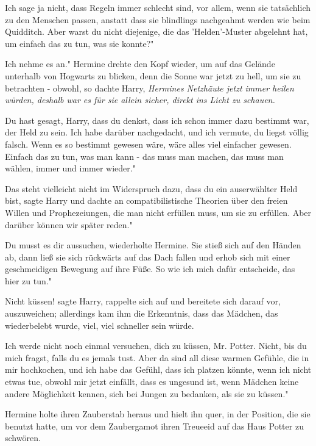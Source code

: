 \glqq{}Ich sage ja nicht, dass Regeln immer schlecht sind, vor allem, wenn sie
tatsächlich zu den Menschen passen, anstatt dass sie blindlings nachgeahmt
werden wie beim Quidditch. Aber warst du nicht diejenige, die das
'Helden'-Muster abgelehnt hat, um einfach das zu tun, was sie konnte?"

\glqq{}Ich nehme es an." Hermine drehte den Kopf wieder, um auf das Gelände
unterhalb von Hogwarts zu blicken, denn die Sonne war jetzt zu hell, um sie zu
betrachten - obwohl, so dachte Harry, \emph{Hermines Netzhäute jetzt immer
heilen würden, deshalb war es für sie allein sicher, direkt ins Licht zu
schauen.}

\glqq{}Du hast gesagt, Harry, dass du denkst, dass ich schon immer dazu bestimmt
war, der Held zu sein. Ich habe darüber nachgedacht, und ich vermute, du liegst
völlig falsch. Wenn es so bestimmt gewesen wäre, wäre alles viel einfacher
gewesen. Einfach das zu tun, was man kann - das muss man machen, das muss man
wählen, immer und immer wieder."

\glqq{}Das steht vielleicht nicht im Widerspruch dazu, dass du ein auserwählter
Held bist\grqq{}, sagte Harry und dachte an compatibilistische Theorien über den
freien Willen und Prophezeiungen, die man nicht erfüllen muss, um sie zu
erfüllen. \glqq{}Aber darüber können wir später reden."

\glqq{}Du musst es dir aussuchen\grqq{}, wiederholte Hermine. Sie stieß sich auf
den Händen ab, dann ließ sie sich rückwärts auf das Dach fallen und erhob sich
mit einer geschmeidigen Bewegung auf ihre Füße. \glqq{}So wie ich mich dafür
entscheide, das hier zu tun."

\glqq{}Nicht küssen!\grqq{} sagte Harry, rappelte sich auf und bereitete sich
darauf vor, auszuweichen; allerdings kam ihm die Erkenntnis, dass das Mädchen,
das wiederbelebt wurde, viel, viel schneller sein würde.

\glqq{}Ich werde nicht noch einmal versuchen, dich zu küssen, Mr. Potter. Nicht,
bis du mich fragst, falls du es jemals tust. Aber da sind all diese warmen
Gefühle, die in mir hochkochen, und ich habe das Gefühl, dass ich platzen
könnte, wenn ich nicht etwas tue, obwohl mir jetzt einfällt, dass es ungesund
ist, wenn Mädchen keine andere Möglichkeit kennen, sich bei Jungen zu bedanken,
als sie zu küssen."

Hermine holte ihren Zauberstab heraus und hielt ihn quer, in der Position, die
sie benutzt hatte, um vor dem Zaubergamot ihren Treueeid auf das Haus Potter zu
schwören.

